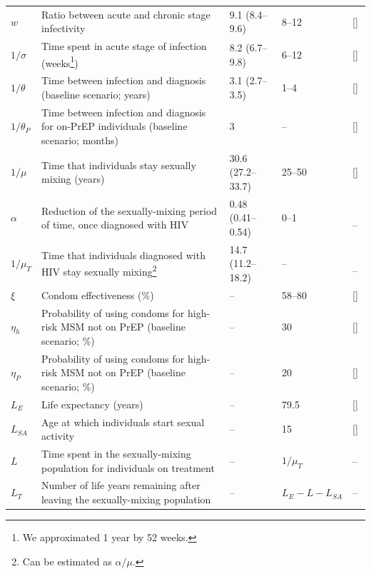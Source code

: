\documentclass[11pt]{article}
\begin{document}
\begin{table}[H]
\begin{minipage}{\textwidth}
\begin{tabular}{l>{\raggedright}p{}l>{\raggedright}p{}l}
 	$w$ 			& Ratio between acute and chronic stage infectivity 	& 9.1 (8.4--9.6) & 8--12 & [\citenum{Patel2014}]\\ 
	$1/\sigma$ 	& Time spent in acute stage of infection (weeks\footnote{We approximated 1 year by 52 weeks.}) & 8.2 (6.7--9.8) & 6--12 & [\citenum{Lodi2011}]\\ 
	$1/\theta$		& Time between infection and diagnosis (baseline scenario; years)	& 3.1 (2.7--3.5) & 1--4 & [\citenum{Marty2019}]\\
	$1/\theta_P$	& Time between infection and diagnosis for on-PrEP individuals (baseline scenario; months)	& 3 & -- & [\citenum{CNSANRS2015}]\\
	$1/\mu$ 		& Time that individuals stay sexually mixing (years) & 30.6 (27.2--33.7) & 25--50 & [\citenum{Velter2015}]\\
	$\alpha$ 		& Reduction of the sexually-mixing period of time, once diagnosed with HIV & 0.48 (0.41--0.54) & 0--1 & \,\, -- \\
	$1/ \mu_T$ 	& Time that individuals diagnosed with HIV stay sexually mixing\footnote{Can be estimated as $\alpha/\mu$.} & 14.7 (11.2--18.2) & -- & \,\, -- \\ \midrule
	$\xi$			& Condom effectiveness (\%) & -- & 58--80 &[\citenum{Smith2015}]\\
	$\eta_h$		& Probability of using condoms for high-risk MSM not on PrEP (baseline scenario; \%) & -- & 30 & [\citenum{Molina2015}]\\
	$\eta_P$		& Probability of using condoms for high-risk MSM not on PrEP	(baseline scenario; \%) & -- & 20 & [\citenum{Molina2018}]\\ \midrule
	$L_E$		& Life expectancy (years) 	& -- & 79.5 & [\citenum{WHO_ART2016,INED_EspVieFrance}]\\
	$L_{SA}$	 	& Age at which individuals start sexual activity & -- & 15 & [\citenum{Velter2015}]\\
	$L$ 			& Time spent in the sexually-mixing population for individuals on treatment & -- & $1/ \mu_T$ & --\\
	$L_T$ 		& Number of life years remaining after leaving the sexually-mixing population & -- & $L_E - L - L_{SA}$ & --\\
	\bottomrule
	\end{tabular}
	\label{tab:Params}
\end{minipage}
\end{table}
\end{document}
